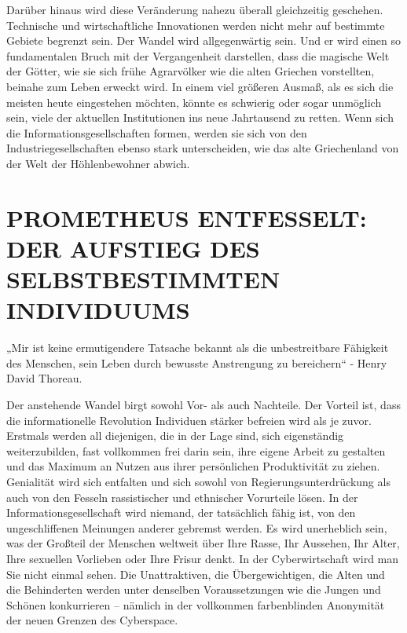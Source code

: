 \documentclass[
  a5paper,
  smalldemyvopaper,10pt,twoside,onecolumn,openright,extrafontsizes,hidelinks]{memoir}
\renewenvironment{quote}%
               {\list{}{\rightmargin=.6cm\leftmargin=.6cm}%
                \itshape \item[]}%
               {\endlist}
\begin{document}
Darüber hinaus wird diese Veränderung nahezu überall gleichzeitig
geschehen. Technische und wirtschaftliche Innovationen werden nicht mehr
auf bestimmte Gebiete begrenzt sein. Der Wandel wird allgegenwärtig
sein. Und er wird einen so fundamentalen Bruch mit der Vergangenheit
darstellen, dass die magische Welt der Götter, wie sie sich frühe
Agrarvölker wie die alten Griechen vorstellten, beinahe zum Leben
erweckt wird. In einem viel größeren Ausmaß, als es sich die meisten
heute eingestehen möchten, könnte es schwierig oder sogar unmöglich
sein, viele der aktuellen Institutionen ins neue Jahrtausend zu retten.
Wenn sich die Informationsgesellschaften formen, werden sie sich von den
Industriegesellschaften ebenso stark unterscheiden, wie das alte
Griechenland von der Welt der Höhlenbewohner abwich.

\section{PROMETHEUS ENTFESSELT: DER AUFSTIEG DES SELBSTBESTIMMTEN
INDIVIDUUMS}\label{prometheus-entfesselt-der-aufstieg-des-selbstbestimmten-individuums}

\begin{quote}
„Mir ist keine ermutigendere Tatsache bekannt als die unbestreitbare
Fähigkeit des Menschen, sein Leben durch bewusste Anstrengung zu
bereichern`` - Henry David Thoreau.
\end{quote}

Der anstehende Wandel birgt sowohl Vor- als auch Nachteile. Der Vorteil
ist, dass die informationelle Revolution Individuen stärker befreien
wird als je zuvor. Erstmals werden all diejenigen, die in der Lage sind,
sich eigenständig weiterzubilden, fast vollkommen frei darin sein, ihre
eigene Arbeit zu gestalten und das Maximum an Nutzen aus ihrer
persönlichen Produktivität zu ziehen. Genialität wird sich entfalten und
sich sowohl von Regierungsunterdrückung als auch von den Fesseln
rassistischer und ethnischer Vorurteile lösen. In der
Informationsgesellschaft wird niemand, der tatsächlich fähig ist, von
den ungeschliffenen Meinungen anderer gebremst werden. Es wird
unerheblich sein, was der Großteil der Menschen weltweit über Ihre
Rasse, Ihr Aussehen, Ihr Alter, Ihre sexuellen Vorlieben oder Ihre
Frisur denkt. In der Cyberwirtschaft wird man Sie nicht einmal sehen.
Die Unattraktiven, die Übergewichtigen, die Alten und die Behinderten
werden unter denselben Voraussetzungen wie die Jungen und Schönen
konkurrieren -- nämlich in der vollkommen farbenblinden Anonymität der
neuen Grenzen des Cyberspace.
\end{document}

